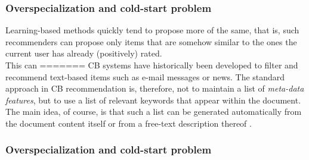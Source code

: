 \subsubsection{Overspecialization and cold-start problem}\label{overspecialization}

Learning-based methods quickly tend to propose more of the same, that
is, such recommenders can propose only items that are somehow similar
to the ones the current user has already (positively) rated. \\This can
=======
CB systems have historically
been developed to filter and recommend text-based items such as e-mail
messages or news. The standard approach in CB recommendation is,
therefore, not to maintain a list of \textit{meta-data
features}, but to use a list of relevant keywords that appear within
the document. The main idea, of course, is that such a list can be
generated automatically from the document content itself or from a
free-text description thereof \cite{jannach2010recommender}.

\subsubsection{Overspecialization and cold-start problem}
\label{overspecialization}

